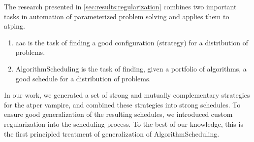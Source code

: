 The research presented in \cref{sec:results:regularization} combines two important tasks in automation of parameterized problem solving and applies them to \gls{atping}.
\begin{enumerate}
\item \Gls{aac} is the task of finding a good configuration (strategy) for a distribution of problems.
\item \Gls{AlgorithmScheduling} is the task of finding, given a portfolio of algorithms, a good schedule for a distribution of problems.
\end{enumerate}
In our work, we generated a set of strong and mutually complementary strategies for the \gls{atper} \gls{vampire},
and combined these strategies into strong schedules.
To ensure good generalization of the resulting schedules, we introduced custom regularization into the scheduling process.
To the best of our knowledge, this is the first principled treatment of generalization of \gls{AlgorithmScheduling}.

